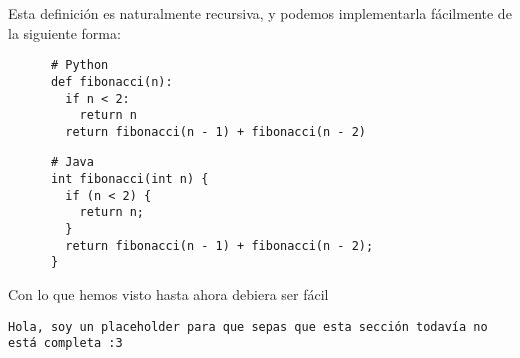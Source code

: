     Esta definición es naturalmente recursiva, y podemos implementarla fácilmente de la siguiente 
    forma:

    \begin{verbatim}
      # Python
      def fibonacci(n):
        if n < 2:
          return n
        return fibonacci(n - 1) + fibonacci(n - 2)
    \end{verbatim}

    \begin{verbatim}
      # Java
      int fibonacci(int n) {
        if (n < 2) {
          return n;
        }
        return fibonacci(n - 1) + fibonacci(n - 2);
      }
    \end{verbatim}

    Con lo que hemos visto hasta ahora debiera ser fácil 
  \begin{center}
    \texttt{Hola, soy un placeholder para que sepas que esta sección todavía no está completa :3}
  \end{center}